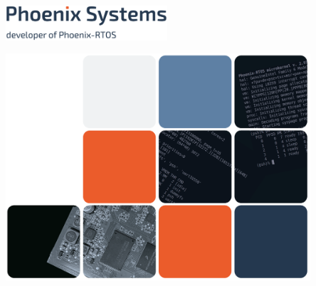 %
%
%
%

\clearpage
\thispagestyle{empty}

\begin{flushleft}
    \includegraphics[width=0.45\textwidth]{company_logo.png}
\end{flushleft}


\vspace{2.5cm}

\begin{flushright}
	\includegraphics[width=0.85\textwidth]{lastpage_image.png}
\end{flushright}

\vspace{1cm}

